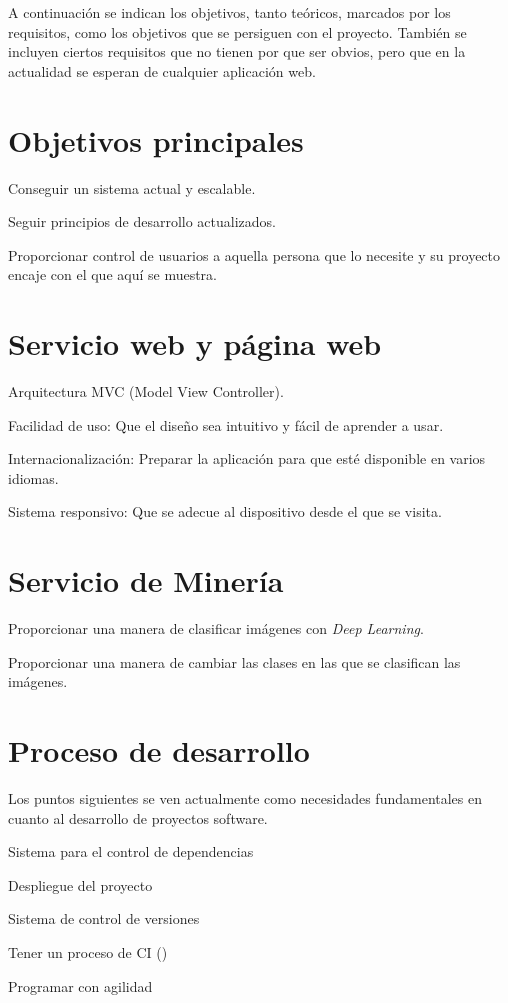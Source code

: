 
A continuación se indican los objetivos, tanto teóricos, marcados por los requisitos, como los objetivos que se persiguen con el proyecto. También se incluyen ciertos requisitos que no tienen por que ser obvios, pero que en la actualidad se esperan de cualquier aplicación web.



\section{Objetivos principales} 
\begin{list}{-}{}
\item Conseguir un sistema actual y escalable.
\item Seguir principios de desarrollo actualizados.
\item Proporcionar control de usuarios a aquella persona que lo necesite y su proyecto encaje con el que aquí se muestra.
\end{list}

\section{Servicio web y página web}
\begin{list}{-}{}
\item Arquitectura MVC (Model View Controller).
\item Facilidad de uso: Que el diseño sea intuitivo y fácil de aprender a usar.
\item Internacionalización: Preparar la aplicación para que esté disponible en varios idiomas.
\item Sistema responsivo: Que se adecue al dispositivo desde el que se visita.
\end{list}

\section{Servicio de Minería}
\begin{list}{-}{}
\item Proporcionar una manera de clasificar imágenes con \emph{Deep Learning}.
\item Proporcionar una manera de cambiar las clases en las que se clasifican las imágenes.
\end{list}

\section{Proceso de desarrollo}
Los puntos siguientes se ven actualmente como necesidades fundamentales en cuanto al desarrollo de proyectos software.
\begin{list}{-}{}
\item Sistema para el control de dependencias
\item Despliegue del proyecto
\item Sistema de control de versiones
\item Tener un proceso de CI () 
\item Programar con agilidad
\end{list}

